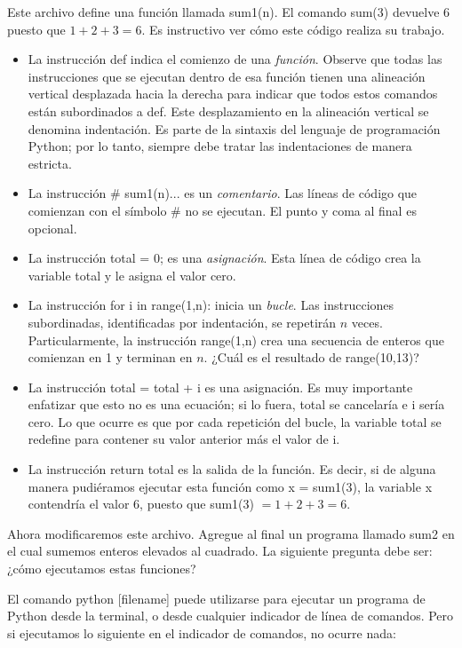 Este archivo define una función llamada {\s sum1(n)}. El comando {\s sum(3)} devuelve 6 puesto que
$1 + 2 + 3 = 6$. Es instructivo ver cómo este código realiza su trabajo.
\begin{itemize}
	\item La instrucción {\s def} indica el comienzo de una \textit{función}. Observe que todas las instrucciones que se ejecutan dentro de esa función tienen una alineación vertical desplazada hacia la derecha para indicar que todos estos comandos están subordinados a {\s def}. Este desplazamiento en la alineación vertical se denomina indentación. Es parte de la sintaxis del lenguaje de programación Python; por lo tanto, siempre debe tratar las indentaciones de manera estricta.
	\item La instrucción {\s \# sum1(n)...} es un \textit{comentario}. Las líneas de código que comienzan con el símbolo {\s \#} no se ejecutan. El punto y coma al final es opcional.
	\item La instrucción {\s total = 0;} es una \textit{asignación}. Esta línea de código crea la variable {\s total} y le asigna el valor cero.
	\item La instrucción {\s for i in range(1,n):} inicia un \textit{bucle}. Las instrucciones subordinadas, identificadas por indentación, se repetirán $n$ veces. Particularmente, la instrucción {\s range(1,n)} crea una secuencia de enteros que comienzan en 1 y terminan en $n$. ¿Cuál es el resultado de {\s range(10,13)}?
	\item La instrucción {\s total = total + i} es una asignación. Es muy importante enfatizar que esto no es una ecuación; si lo fuera, {\s total} se cancelaría e {\s i} sería cero. Lo que ocurre es que por cada repetición del bucle, la variable {\s total} se redefine para contener su valor anterior más el valor de {\s i}.
	\item La instrucción {\s return total} es la salida de la función. Es decir, si de alguna manera pudiéramos ejecutar esta función como {\s x = sum1(3)}, la variable {\s x} contendría el valor 6, puesto que {\s sum1(3)} $= 1 + 2 + 3 = 6$.
\end{itemize}

Ahora modificaremos este archivo. Agregue al final un programa llamado {\s sum2} en el cual sumemos enteros elevados al cuadrado. La siguiente pregunta debe ser: ¿cómo ejecutamos estas funciones?

El comando {\s python [filename]} puede utilizarse para ejecutar un programa de Python desde la terminal, o desde cualquier indicador de línea de comandos. Pero si ejecutamos lo siguiente en el indicador de comandos, no ocurre nada:

